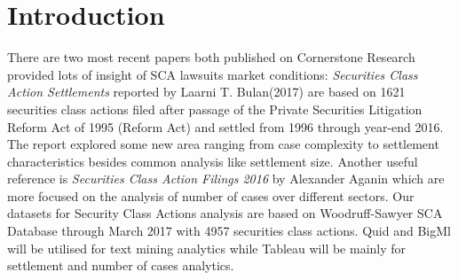 \section{Introduction}
There are two most recent papers both published on Cornerstone Research provided lots of insight of SCA lawsuits market conditions: \textit{Securities Class Action Settlements} reported by Laarni T. Bulan(2017)\hl{\cite{4}} are based on 1621 securities class actions filed after passage of the Private Securities Litigation Reform Act of 1995 (Reform Act) and settled from 1996 through year-end 2016. The report explored some new area ranging from case complexity to settlement characteristics besides common analysis like settlement size. Another useful reference is \textit{Securities Class Action Filings 2016} by Alexander Aganin \hl{\cite{3}} which are more focused on  the analysis of number of cases over different sectors. Our datasets for Security Class Actions analysis are based on Woodruff-Sawyer SCA Database through March 2017 with 4957 securities class actions. Quid and BigMl will be utilised for text mining analytics while Tableau will be mainly for settlement and number of cases analytics. 
